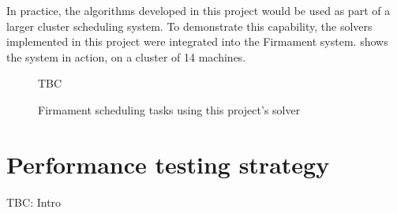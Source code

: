 In practice, the algorithms developed in this project would be used as part of a larger cluster scheduling system. To demonstrate this capability, the solvers implemented in this project were integrated into the Firmament system.  shows the system in action, on a cluster of 14 machines.

\begin{figure}
    TBC
    \caption{Firmament scheduling tasks using this project's solver}
    \label{fig:firmament-ui}
\end{figure}

\section{Performance testing strategy} \label{sec:eval-benchmark-strategy}

TBC: Intro


%
%
%


%

